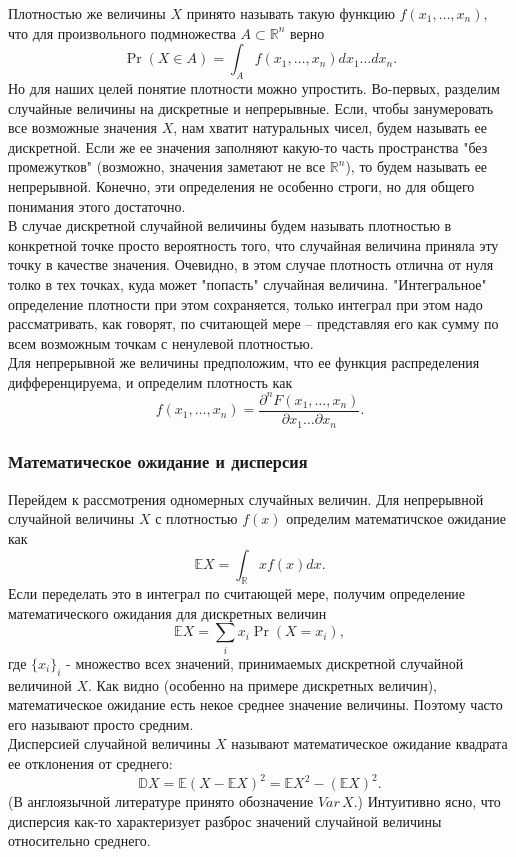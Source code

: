 \documentclass[12pt,a4paper]{book}
\begin{document}
Плотностью же величины $X$ принято называть такую функцию $f \left(x_1, \dots, x_n\right),$ что для произвольного подмножества $A \subset \mathbb{R}^n$ верно
$$ \Pr\left(X \in A \right) = \int_A f \left(x_1, \dots, x_n\right) dx_1 \dots dx_n.$$
Но для наших целей понятие плотности можно упростить. Во-первых, разделим случайные величины на дискретные и непрерывные. Если, чтобы занумеровать все возможные значения $X$, нам хватит натуральных чисел, будем называть ее дискретной. Если же ее значения заполняют какую-то часть пространства "без промежутков" (возможно, значения заметают не все $\mathbb{R}^n$), то будем называть ее непрерывной. Конечно, эти определения не особенно строги, но для общего понимания этого достаточно.\\
В случае дискретной случайной величины будем называть плотностью в конкретной точке просто вероятность того, что случайная величина приняла эту точку в качестве значения. Очевидно, в этом случае плотность отлична от нуля толко в тех точках, куда может "попасть" случайная величина. "Интегральное" определение плотности при этом сохраняется, только интеграл при этом надо рассматривать, как говорят, по считающей мере -- представляя его как сумму по всем возможным точкам с ненулевой плотностью.\\
Для непрерывной же величины предположим, что ее функция распределения дифференцируема, и определим плотность как
$$ f \left(x_1, \dots, x_n\right) = \dfrac{\partial^n F\left(x_1, \dots, x_n\right)}{\partial x_1 \dots \partial x_n}.$$
\subsubsection{Математическое ожидание и дисперсия}
Перейдем к рассмотрения одномерных случайных величин. Для непрерывной случайной величины $X$ с плотностью $f \left( x \right)$ определим математичское ожидание как 
$$ \mathbb{E}X = \int_\mathbb{R} x f\left( x \right) dx.$$
Если переделать это в интеграл по считающей мере, получим определение математического ожидания для дискретных величин
$$ \mathbb{E}X = \sum_i x_i \Pr \left(X = x_i \right), $$
где $\{ x_i \}_i$ - множество всех значений, принимаемых дискретной случайной величиной $X$. Как видно (особенно на примере дискретных величин), математическое ожидание есть некое среднее значение величины. Поэтому часто его называют просто средним.\\

Дисперсией случайной величины $X$ называют математическое ожидание квадрата ее отклонения от среднего:
$$ \mathbb{D}X = \mathbb{E} \left( X - \mathbb{E}X \right)^2 = \mathbb{E} X^2 - \left( \mathbb{E}X \right)^2. $$
(В англоязычной литературе принято обозначение $Var \, X.$) Интуитивно ясно, что дисперсия как-то характеризует разброс значений случайной величины относительно среднего.\\
\end{document}
